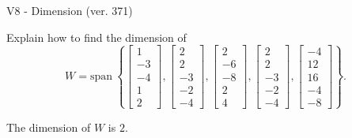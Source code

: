 \begin{exercise}
  \begin{exerciseTitle}V8 - Dimension (ver. 371)\end{exerciseTitle}
  \begin{exerciseStatement}
    Explain how to find the dimension of 
\[W=\mathrm{span}\ \left\{\left[\begin{array}{r}
1 \\
-3 \\
-4 \\
1 \\
2
\end{array}\right] , \left[\begin{array}{r}
2 \\
2 \\
-3 \\
-2 \\
-4
\end{array}\right] , \left[\begin{array}{r}
2 \\
-6 \\
-8 \\
2 \\
4
\end{array}\right] , \left[\begin{array}{r}
2 \\
2 \\
-3 \\
-2 \\
-4
\end{array}\right] , \left[\begin{array}{r}
-4 \\
12 \\
16 \\
-4 \\
-8
\end{array}\right]\right\}.\]



  \end{exerciseStatement}
  \begin{exerciseAnswer}
   The dimension of \(W\) is  \(2\).
  


  \end{exerciseAnswer}
\end{exercise}